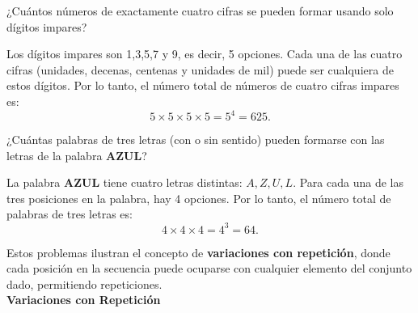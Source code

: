 \documentclass[12pt,a4paper]{book}
\begin{document}
    \begin{mdframed}[style=mdgraybox, frametitle={Problema 11: Números de cuatros cifras impares}]
        ¿Cuántos números de exactamente cuatro cifras se pueden formar usando solo dígitos impares?
    \end{mdframed}

    \begin{solucion}
        Los dígitos impares son 1,3,5,7 y 9, es decir, 5 opciones. Cada una de las cuatro cifras (unidades, decenas, centenas y unidades de mil) puede ser cualquiera de estos dígitos. Por lo tanto, el número total de números de cuatro cifras impares es:
        \begin{equation*}
            5\times5\times5\times5=5^{4}=625.
        \end{equation*}
    \end{solucion}

    \begin{mdframed}[style=mdgraybox,frametitle={Problema 12: Palabras de tres letras}]
        ¿Cuántas palabras de tres letras (con o sin sentido) pueden formarse con las letras de la palabra \textbf{AZUL}?
    \end{mdframed}

    \begin{solucion}
        La palabra \textbf{AZUL} tiene cuatro letras distintas: $A,Z,U,L$. Para cada una de las tres posiciones en la palabra, hay 4 opciones. Por lo tanto, el número total de palabras de tres letras es:
        \begin{equation*}
            4\times4\times4=4^{3}=64.
        \end{equation*}
    \end{solucion}
    
    Estos problemas ilustran el concepto de \textbf{variaciones con repetición}, donde cada posición en la secuencia puede ocuparse con cualquier elemento del conjunto dado, permitiendo repeticiones.\\

    {\large \textbf{Variaciones con Repetición}}
\end{document}
